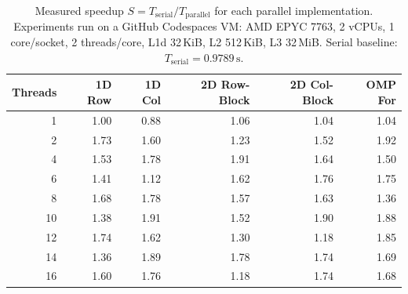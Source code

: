 \begin{table}[htb]
  \centering
  \caption{Measured speedup $S = T_{\text{serial}}/T_{\text{parallel}}$ for each
           parallel implementation. Experiments run on a GitHub Codespaces VM:
           AMD EPYC 7763, 2 vCPUs, 1 core/socket, 2 threads/core,
           L1d 32\,KiB, L2 512\,KiB, L3 32\,MiB.
           Serial baseline: $T_{\text{serial}} = 0.9789\,\text{s}$.}
  \label{tab:speedup}
  \begin{tabular}{r|rrrrr}
    \toprule
    Threads & 1D Row & 1D Col & 2D Row-Block & 2D Col-Block & OMP For \\
    \midrule
    1  & 1.00 & 0.88 & 1.06 & 1.04 & 1.04 \\
    2  & 1.73 & 1.60 & 1.23 & 1.52 & 1.92 \\
    4  & 1.53 & 1.78 & 1.91 & 1.64 & 1.50 \\
    6  & 1.41 & 1.12 & 1.62 & 1.76 & 1.75 \\
    8  & 1.68 & 1.78 & 1.57 & 1.63 & 1.36 \\
    10 & 1.38 & 1.91 & 1.52 & 1.90 & 1.88 \\
    12 & 1.74 & 1.62 & 1.30 & 1.18 & 1.85 \\
    14 & 1.36 & 1.89 & 1.78 & 1.74 & 1.69 \\
    16 & 1.60 & 1.76 & 1.18 & 1.74 & 1.68 \\
    \bottomrule
  \end{tabular}
\end{table}

